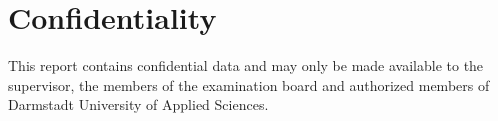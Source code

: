 \chapter*{Confidentiality}

This report contains confidential data and may only be made available to the supervisor, the members of the examination board and authorized members of Darmstadt University of Applied Sciences.